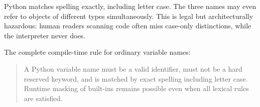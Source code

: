 Python matches spelling exactly, including letter case. The three names may even refer to objects of different types simultaneously. This is legal but architecturally hazardous: human readers scanning code often miss case-only distinctions, while the interpreter never does.

The complete compile-time rule for ordinary variable names:

\begin{quote}
A Python variable name must be a valid identifier, must not be a hard reserved keyword, and is matched by exact spelling including letter case. Runtime masking of built-ins remains possible even when all lexical rules are satisfied.
\end{quote}
